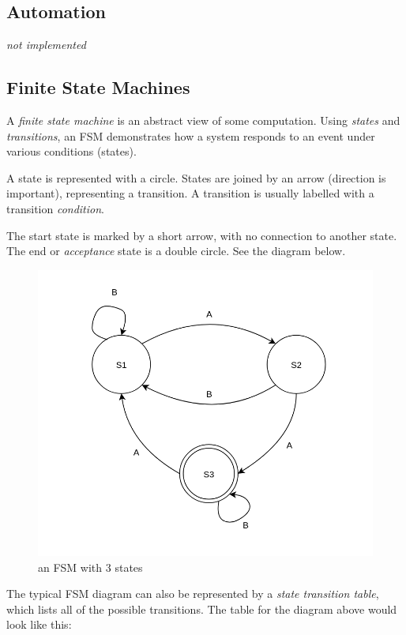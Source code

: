 \documentclass[9pt]{article}
\begin{document}
\subsection{Automation}
\label{sec:org1c70bd6}

\emph{not implemented}

\subsection{Finite State Machines}
\label{sec:org2b23f3c}

A \emph{finite state machine} is an abstract view of some computation. Using \emph{states} and \emph{transitions}, an FSM demonstrates how a system responds to an event under various conditions (states).

A state is represented with a circle. States are joined by an arrow (direction is important), representing a transition. A transition is usually labelled with a transition \emph{condition}.

The start state is marked by a short arrow, with no connection to another state. The end or \emph{acceptance} state is a double circle. See the diagram below.

\begin{figure}[htbp]
\centering
\includegraphics[width=.9\linewidth]{./images/fsm.png}
\caption{an FSM with 3 states}
\end{figure}

The typical FSM diagram can also be represented by a \emph{state transition table}, which lists all of the possible transitions. The table for the diagram above would look like this:
\end{document}
